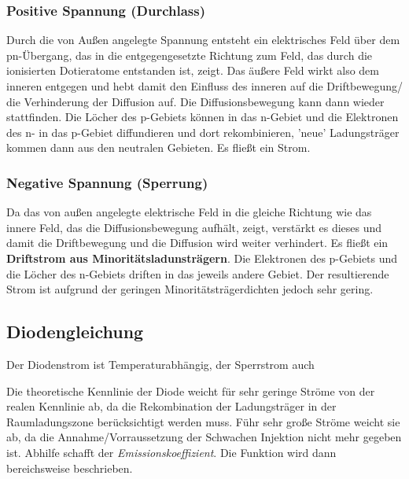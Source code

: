 \documentclass[a4paper, 12pt]{article}
\begin{document}
\subsubsection*{Positive Spannung (Durchlass)}
Durch die von Außen angelegte Spannung entsteht ein elektrisches Feld über dem
pn-Übergang, das in
die entgegengesetzte Richtung zum Feld, das durch die ionisierten Dotieratome
entstanden ist, zeigt. Das äußere Feld wirkt also dem inneren entgegen und hebt
damit den Einfluss des inneren auf die Driftbewegung/ die Verhinderung der
Diffusion auf. Die Diffusionsbewegung kann dann wieder stattfinden. Die Löcher
des p-Gebiets können in das n-Gebiet und die Elektronen des n- in das p-Gebiet
diffundieren und dort rekombinieren, 'neue' Ladungsträger kommen dann aus den
neutralen Gebieten. Es fließt ein Strom.

\subsubsection*{Negative Spannung (Sperrung)}
Da das von außen angelegte elektrische Feld in die gleiche Richtung wie das
innere Feld, das die Diffusionsbewegung aufhält, zeigt, verstärkt es dieses und
damit die Driftbewegung und
die Diffusion wird weiter verhindert. Es fließt ein \textbf{Driftstrom aus
  Minoritätsladunsträgern}. Die Elektronen des p-Gebiets und die Löcher des
n-Gebiets driften in das jeweils andere Gebiet. Der resultierende Strom ist
aufgrund der geringen Minoritätsträgerdichten jedoch sehr gering.


\holine{\textwidth}
\subsection*{Diodengleichung}
\notebox{
  \[ I_D = I_S \cdot (e^{\dfrac{U_{pn}}{U_T}} - 1)  \]
}

Der Diodenstrom ist Temperaturabhängig, der Sperrstrom auch

Die theoretische Kennlinie der Diode weicht für sehr geringe Ströme von der
realen Kennlinie ab, da die Rekombination der Ladungsträger in der
Raumladungszone berücksichtigt werden muss. Führ sehr große Ströme weicht sie
ab, da die Annahme/Vorraussetzung der Schwachen Injektion nicht mehr gegeben ist.
Abhilfe schafft der \emph{Emissionskoeffizient}. Die Funktion wird dann
bereichsweise beschrieben.
\end{document}
